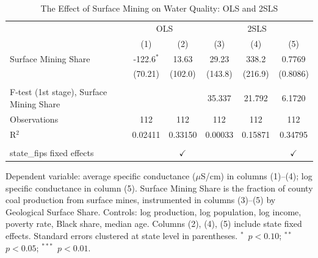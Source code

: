 
\begin{table}[htbp]
   \caption{\label{tab:main} The Effect of Surface Mining on Water Quality: OLS and 2SLS}
   \bigskip
   \centering
   \small
   \begin{tabular}{lccccc}
      \toprule
       & \multicolumn{2}{c}{OLS} & \multicolumn{3}{c}{2SLS} \\ 
                                               & (1)          & (2)           & (3)     & (4)     & (5)\\  
      \midrule 
      Surface Mining Share                     & -122.6$^{*}$ & 13.63         & 29.23   & 338.2   & 0.7769\\   
                                               & (70.21)      & (102.0)       & (143.8) & (216.9) & (0.8086)\\   
       \\
      F-test (1st stage), Surface Mining Share &              &               & 35.337  & 21.792  & 6.1720\\  
      Observations                             & 112          & 112           & 112     & 112     & 112\\  
      R$^2$                                    & 0.02411      & 0.33150       & 0.00033 & 0.15871 & 0.34795\\  
       \\
      state\_fips fixed effects                &              & $\checkmark$  &         &         & $\checkmark$\\   
      \bottomrule
   \end{tabular}
   
   \par \raggedright 
   Dependent variable: average specific conductance ($\mu$S/cm) in columns (1)--(4); log specific conductance in column (5). Surface Mining Share is the fraction of county coal production from surface mines, instrumented in columns (3)--(5) by Geological Surface Share. Controls: log production, log population, log income, poverty rate, Black share, median age. Columns (2), (4), (5) include state fixed effects. Standard errors clustered at state level in parentheses. $^{*}$~$p<0.10$; $^{**}$~$p<0.05$; $^{***}$~$p<0.01$.
\end{table}


